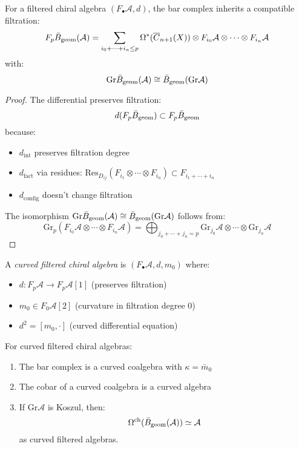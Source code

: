 \begin{theorem}
For a filtered chiral algebra $(F_\bullet\mathcal{A}, d)$, the bar complex inherits a compatible filtration:
$$F_p\bar{B}_{\text{geom}}(\mathcal{A}) = \sum_{i_0 + \cdots + i_n \leq p} \Omega^*(\overline{C}_{n+1}(X)) \otimes F_{i_0}\mathcal{A} \otimes \cdots \otimes F_{i_n}\mathcal{A}$$
with:
$$\text{Gr}\bar{B}_{\text{geom}}(\mathcal{A}) \cong \bar{B}_{\text{geom}}(\text{Gr}\mathcal{A})$$
\end{theorem}

\begin{proof}
The differential preserves filtration:
$$d(F_p\bar{B}_{\text{geom}}) \subset F_p\bar{B}_{\text{geom}}$$
because:
\begin{itemize}
\item $d_{\text{int}}$ preserves filtration degree
\item $d_{\text{fact}}$ via residues: $\text{Res}_{D_{ij}}(F_{i_1} \otimes \cdots \otimes F_{i_n}) \subset F_{i_1 + \cdots + i_n}$
\item $d_{\text{config}}$ doesn't change filtration
\end{itemize}

The isomorphism $\text{Gr}\bar{B}_{\text{geom}}(\mathcal{A}) \cong \bar{B}_{\text{geom}}(\text{Gr}\mathcal{A})$ follows from:
$$\text{Gr}_p(F_{i_0}\mathcal{A} \otimes \cdots \otimes F_{i_n}\mathcal{A}) = \bigoplus_{j_0 + \cdots + j_n = p} \text{Gr}_{j_0}\mathcal{A} \otimes \cdots \otimes \text{Gr}_{j_n}\mathcal{A}$$
\end{proof}

\begin{definition}
A \emph{curved filtered chiral algebra} is $(F_\bullet\mathcal{A}, d, m_0)$ where:
\begin{itemize}
\item $d: F_p\mathcal{A} \to F_p\mathcal{A}[1]$ (preserves filtration)
\item $m_0 \in F_0\mathcal{A}[2]$ (curvature in filtration degree 0)
\item $d^2 = [m_0, \cdot]$ (curved differential equation)
\end{itemize}
\end{definition}

\begin{theorem}
For curved filtered chiral algebras:
\begin{enumerate}
\item The bar complex is a curved coalgebra with $\kappa = \bar{m}_0$
\item The cobar of a curved coalgebra is a curved algebra
\item If $\text{Gr}\mathcal{A}$ is Koszul, then:
$$\Omega^{\text{ch}}(\bar{B}_{\text{geom}}(\mathcal{A})) \simeq \mathcal{A}$$
as curved filtered algebras.
\end{enumerate}
\end{theorem}

